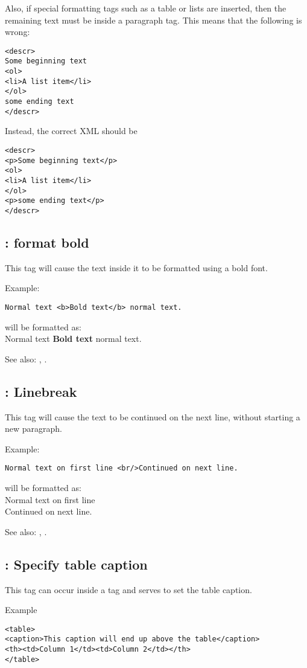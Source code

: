 Also, if special formatting tags such as a table or lists are inserted, then
the remaining text must be inside a paragraph tag. This means that the
following is wrong:
\begin{verbatim}
<descr>
Some beginning text
<ol>
<li>A list item</li>
</ol>
some ending text
</descr>
\end{verbatim}
Instead, the correct XML should be
\begin{verbatim}
<descr>
<p>Some beginning text</p>
<ol>
<li>A list item</li>
</ol>
<p>some ending text</p>
</descr>
\end{verbatim}

\subsection{ : format bold}
\label{tag:b}
This tag will cause the text inside it to be formatted using a bold font.

Example:
\begin{verbatim}
Normal text <b>Bold text</b> normal text.
\end{verbatim}
will be formatted as:\\
Normal text \textbf{Bold text} normal text.

See also: , .

\subsection{ : Linebreak}
\label{tag:br}
This tag will cause the text to be continued on the next line, without
starting a new paragraph.

Example:
\begin{verbatim}
Normal text on first line <br/>Continued on next line.
\end{verbatim}
will be formatted as:\\
Normal text on first line\\
Continued on next line.

See also: , .

\subsection{ : Specify table caption}
\label{tag:caption}
This tag can occur inside a  tag and serves to set the table 
caption.

Example
\begin{verbatim}
<table>
<caption>This caption will end up above the table</caption>
<th><td>Column 1</td><td>Column 2</td></th>
</table>
\end{verbatim}

